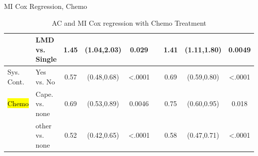 \begin{frame}{MI Cox Regression, Chemo}
\begin{table}[]
{\begin{tabular}{|l|l|c|c|c|c|c|c|c|}
                               & LMD vs. Single                   & 1.45                                                & (1.04,2.03)           & 0.029                 &                       & 1.41                  & (1.11,1.80) & 0.0049                                                      \\ \hline
Sys. Cont.                     & Yes vs. No                       & 0.57                                                & (0.48,0.68)           & \textless .0001       &                       & 0.69                  & (0.59,0.80) & \textless .0001                                             \\ \hline
\hl{Chemo}                          & Cape. vs. none                   & 0.69                                                & (0.53,0.89)           & 0.0046                &                       & 0.75                  & (0.60,0.95) & 0.018                                                       \\ \hline
                               & other vs. none                   & 0.52                                                & (0.42,0.65)           & \textless .0001       &                       & 0.58                  & (0.47,0.71) & \textless .0001                                             \\ \hline
\end{tabular}
}
\caption{AC and MI Cox regression with Chemo Treatment}
\label{acmi_cox_chemo}
\end{table} 
\end{frame}


